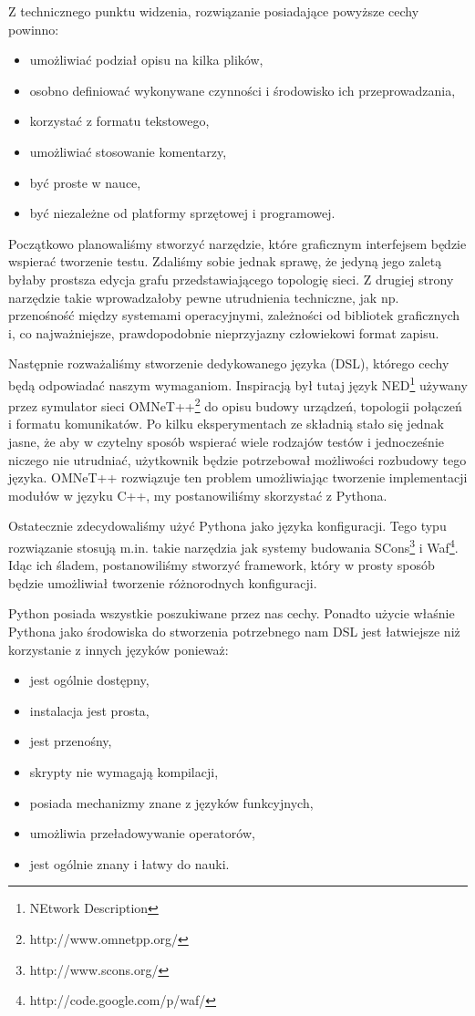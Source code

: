 \documentclass[00-praca-magisterska.tex]{subfiles}
\begin{document}
Z technicznego punktu widzenia, rozwiązanie posiadające powyższe cechy
powinno:
\begin{itemize}
\item umożliwiać podział opisu na kilka plików,
\item osobno definiować wykonywane czynności i środowisko ich przeprowadzania,
\item korzystać z formatu tekstowego,
\item umożliwiać stosowanie komentarzy,
\item być proste w nauce,
\item być niezależne od platformy sprzętowej i programowej.
\end{itemize}

Początkowo planowaliśmy stworzyć narzędzie, które graficznym interfejsem
będzie wspierać tworzenie testu. Zdaliśmy sobie jednak sprawę, że jedyną jego
zaletą byłaby prostsza edycja grafu przedstawiającego topologię sieci. Z
drugiej strony narzędzie takie wprowadzałoby pewne utrudnienia techniczne, jak
np. przenośność między systemami operacyjnymi, zależności od bibliotek
graficznych i, co najważniejsze, prawdopodobnie nieprzyjazny człowiekowi
format zapisu.

Następnie rozważaliśmy stworzenie dedykowanego języka (DSL), którego cechy będą
odpowiadać naszym wymaganiom. Inspiracją był tutaj język NED\footnote{NEtwork
Description} używany przez symulator sieci
OMNeT++\footnote{http://www.omnetpp.org/} do opisu budowy urządzeń, topologii
połączeń i formatu komunikatów. Po kilku eksperymentach ze składnią stało się
jednak jasne, że aby w czytelny sposób wspierać wiele rodzajów testów i
jednocześnie niczego nie utrudniać, użytkownik będzie potrzebował możliwości
rozbudowy tego języka. OMNeT++ rozwiązuje ten problem umożliwiając tworzenie
implementacji modułów w języku C++, my postanowiliśmy skorzystać z Pythona.

Ostatecznie zdecydowaliśmy użyć Pythona jako języka konfiguracji. Tego typu
rozwiązanie stosują m.in. takie narzędzia jak systemy budowania
SCons\footnote{http://www.scons.org/} i
Waf\footnote{http://code.google.com/p/waf/}.  Idąc ich śladem, postanowiliśmy
stworzyć framework, który w prosty sposób będzie umożliwiał tworzenie
różnorodnych konfiguracji.

Python posiada wszystkie poszukiwane przez nas cechy. Ponadto użycie właśnie
Pythona jako środowiska do stworzenia potrzebnego nam DSL jest łatwiejsze niż
korzystanie z innych języków ponieważ:
\begin{itemize}
\item jest ogólnie dostępny,
\item instalacja jest prosta,
\item jest przenośny,
\item skrypty nie wymagają kompilacji,
\item posiada mechanizmy znane z języków funkcyjnych,
\item umożliwia przeładowywanie operatorów,
\item jest ogólnie znany i łatwy do nauki.
\end{itemize}
\end{document}
